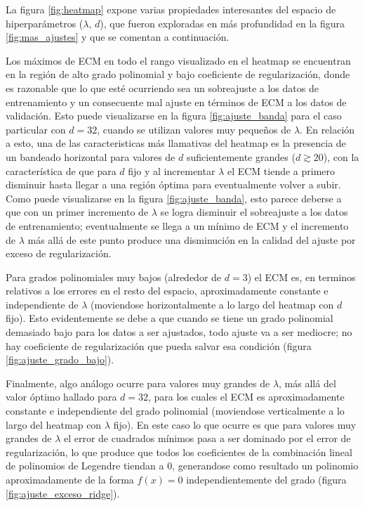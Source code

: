\documentclass{article}
\begin{document}
La figura \ref{fig:heatmap} expone varias propiedades interesantes del espacio de hiperparámetros ($\lambda$, $d$), que fueron exploradas en más profundidad en la figura \ref{fig:mas_ajustes} y que se comentan a continuación. 

Los máximos de ECM en todo el rango visualizado en el heatmap se encuentran en la región de alto grado polinomial y bajo coeficiente de regularización, donde es razonable que lo que esté ocurriendo sea un sobreajuste a los datos de entrenamiento y un consecuente mal ajuste en términos de ECM a los datos de validación. Esto puede visualizarse en la figura \ref{fig:ajuste_banda} para el caso particular con $d=32$, cuando se utilizan valores muy pequeños de $\lambda$. En relación a esto, una de las caracteristicas más llamativas del heatmap es la presencia de un bandeado horizontal para valores de $d$ suficientemente grandes ($d \gtrsim 20$), con la característica de que para $d$ fijo y al incrementar $\lambda$ el ECM tiende a primero disminuir hasta llegar a una región óptima para eventualmente volver a subir. Como puede visualizarse en la figura \ref{fig:ajuste_banda}, esto parece deberse a que con un primer incremento de $\lambda$ se logra disminuir el sobreajuste a los datos de entrenamiento; eventualmente se llega a un mínimo de ECM y el incremento de $\lambda$ más allá de este punto produce una disminución en la calidad del ajuste por exceso de regularización.

Para grados polinomiales muy bajos (alrededor de $d=3$) el ECM es, en terminos relativos a los errores en el resto del espacio, aproximadamente constante e independiente de $\lambda$ (moviendose horizontalmente a lo largo del heatmap con $d$ fijo). Esto evidentemente se debe a que cuando se tiene un grado polinomial demasiado bajo para los datos a ser ajustados, todo ajuste va a ser mediocre; no hay coeficiente de regularización que pueda salvar esa condición (figura \ref{fig:ajuste_grado_bajo}).

Finalmente, algo análogo ocurre para valores muy grandes de $\lambda$, más allá del valor óptimo hallado para $d=32$, para los cuales el ECM es aproximadamente constante e independiente del grado polinomial (moviendose verticalmente a lo largo del heatmap con $\lambda$ fijo). En este caso lo que ocurre es que para valores muy grandes de $\lambda$ el error de cuadrados mínimos pasa a ser dominado por el error de regularización, lo que produce que todos los coeficientes de la combinación lineal de polinomios de Legendre tiendan a 0, generandose como resultado un polinomio aproximadamente de la forma $f(x)=0$ independientemente del grado (figura \ref{fig:ajuste_exceso_ridge}).
\end{document}
